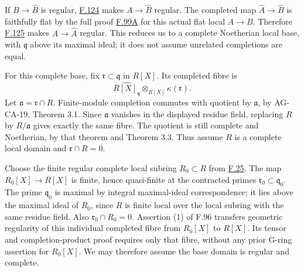 \documentclass[11pt,a4paper,openany]{report}
\begin{document}
If \(B\to\widehat B\) is regular, \hyperref[AG-RG-S05-more-algebra-lemma-regular-composition]{F.124} makes \(A\to\widehat B\) regular. The completed map \(\widehat A\to\widehat B\) is faithfully flat by the full proof \hyperref[AG-RG-S05-completion-flat-local-map]{F.99A} for this actual flat local \(A\to B\). Therefore \hyperref[AG-RG-S05-more-algebra-lemma-regular-permanence]{F.125} makes \(A\to\widehat A\) regular. This reduces us to a complete Noetherian local base, with \(\mathfrak q\) above its maximal ideal; it does not assume unrelated completions are equal.

For this complete base, fix \(\mathfrak r\subset\mathfrak q\) in \(R[X]\). Its completed fibre is \[\widehat{R[X]_{\mathfrak q}}\otimes_{R[X]}\kappa(\mathfrak r).\] Let \(\mathfrak a=\mathfrak r\cap R\). Finite-module completion commutes with quotient by \(\mathfrak a\), by AG-CA-19, Theorem 3.1. Since \(\mathfrak a\) vanishes in the displayed residue field, replacing \(R\) by \(R/\mathfrak a\) gives exactly the same fibre. The quotient is still complete and Noetherian, by that theorem and Theorem 3.3. Thus assume \(R\) is a complete local domain and \(\mathfrak r\cap R=0\).

Choose the finite regular complete local subring \(R_0\subset R\) from \hyperref[AG-RG-S05-algebra-lemma-complete-local-Noetherian-domain-finite-over-regular]{F.25}. The map \(R_0[X]\to R[X]\) is finite, hence quasi-finite at the contracted primes \(\mathfrak r_0\subset\mathfrak q_0\). The prime \(\mathfrak q_0\) is maximal by integral maximal-ideal correspondence; it lies above the maximal ideal of \(R_0\), since \(R\) is finite local over the local subring with the same residue field. Also \(\mathfrak r_0\cap R_0=0\). Assertion (1) of F.96 transfers geometric regularity of this individual completed fibre from \(R_0[X]\) to \(R[X]\). Its tensor and completion-product proof requires only that fibre, without any prior G-ring assertion for \(R_0[X]\). We may therefore assume the base domain is regular and complete.
\end{document}
